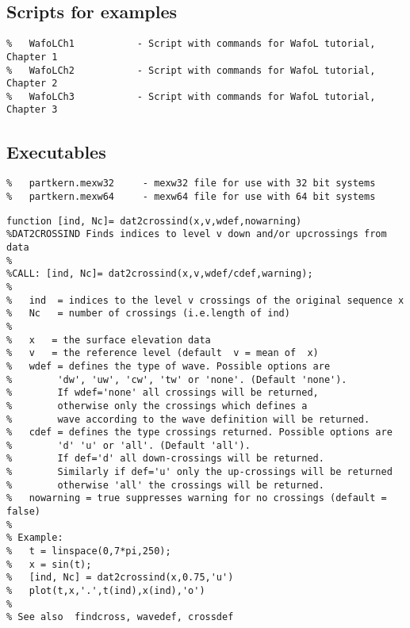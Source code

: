 {\subsection*{Scripts for examples}
\begin{verbatim}
%   WafoLCh1           - Script with commands for WafoL tutorial, Chapter 1
%   WafoLCh2           - Script with commands for WafoL tutorial, Chapter 2
%   WafoLCh3           - Script with commands for WafoL tutorial, Chapter 3
\end{verbatim}

\subsection*{Executables}
\begin{verbatim}
%   partkern.mexw32  	- mexw32 file for use with 32 bit systems
%   partkern.mexw64  	- mexw64 file for use with 64 bit systems
\end{verbatim}
\clearpage

\begin{verbatim}
function [ind, Nc]= dat2crossind(x,v,wdef,nowarning)
%DAT2CROSSIND Finds indices to level v down and/or upcrossings from data
%
%CALL: [ind, Nc]= dat2crossind(x,v,wdef/cdef,warning);
%
%   ind  = indices to the level v crossings of the original sequence x
%   Nc   = number of crossings (i.e.length of ind) 
%
%   x   = the surface elevation data
%   v   = the reference level (default  v = mean of  x)
%   wdef = defines the type of wave. Possible options are
%        'dw', 'uw', 'cw', 'tw' or 'none'. (Default 'none').
%        If wdef='none' all crossings will be returned,
%        otherwise only the crossings which defines a 
%        wave according to the wave definition will be returned.
%   cdef = defines the type crossings returned. Possible options are
%        'd' 'u' or 'all'. (Default 'all').
%        If def='d' all down-crossings will be returned.
%        Similarly if def='u' only the up-crossings will be returned
%        otherwise 'all' the crossings will be returned.
%   nowarning = true suppresses warning for no crossings (default = false)
%
% Example: 
%   t = linspace(0,7*pi,250); 
%   x = sin(t);
%   [ind, Nc] = dat2crossind(x,0.75,'u')
%   plot(t,x,'.',t(ind),x(ind),'o')  
%
% See also  findcross, wavedef, crossdef
\end{verbatim}
\clearpage

}
